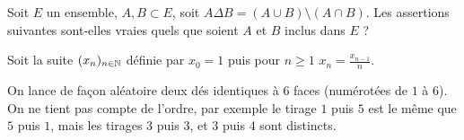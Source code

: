 \begin{question}
 Soit $E$ un ensemble, $A,B \subset E$, soit $A\Delta B = (A\cup B)\setminus(A\cap B)$.
Les assertions suivantes sont-elles vraies quels que soient $A$ et
$B$ inclus dans $E$ ?
\begin{answers}




\end{answers}
\end{question}


\begin{question}
Soit la suite $(x_n)_{n\in \mathbb{N}}$ définie par $x_0=1$ puis pour
$n \ge 1$ $x_n=\frac {x_{n-1}}{n}$.
\begin{answers}




\end{answers}
\end{question}


\begin{question}
On lance de façon aléatoire deux dés identiques à $6$
faces (numérotées de $1$ à $6$). On ne tient pas compte de
l'ordre, par exemple le tirage $1$ puis $5$ est le même que $5$
puis $1$, mais les tirages $3$ puis $3$, et $3$ puis $4$ sont
distincts.
\begin{answers}




\end{answers}
\end{question}


